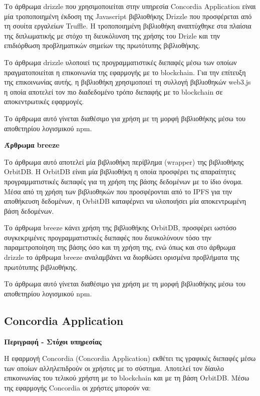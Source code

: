 Το άρθρωμα drizzle που χρησιμοποιείται στην υπηρεσία Concordia Application είναι μία τροποποιημένη έκδοση της Javascript βιβλιοθήκης Drizzle που προσφέρεται από τη σουίτα εργαλείων Truffle. Η τροποποιημένη βιβλιοθήκη αναπτύχθηκε στα πλαίσια της διπλωματικής με στόχο τη διευκόλυνση της χρήσης του Drizle και την επιδιόρθωση προβληματικών σημείων της πρωτότυπης βιβλιοθήκης.

Το άρθρωμα drizzle υλοποιεί τις προγραμματιστικές διεπαφές μέσω των οποίων πραγματοποιείται η επικοινωνία της εφαρμογής με το blockchain. Για την επίτευξη της επικοινωνίας αυτής, η βιβλιοθήκη χρησιμοποιεί τη συλλογή βιβλιοθηκών web3.js η οποία αποτελεί τον πιο διαδεδομένο τρόπο διεπαφής με το blockchain σε αποκεντρωτικές εφαρμογές.

Το άρθρωμα αυτό γίνεται διαθέσιμο για χρήση με τη μορφή βιβλιοθήκης μέσω του αποθετηρίου λογισμικού npm.

\vspace{0.5cm}
\textbf{Άρθρωμα breeze}

Το άρθρωμα αυτό αποτελεί μία βιβλιοθήκη περίβλημα (wrapper) της βιβλιοθήκης OrbitDB. Η OrbitDB είναι μία βιβλιοθήκη η οποία προσφέρει τις απαραίτητες προγραμματιστικές διεπαφές για τη χρήση της βάσης δεδομένων με το ίδιο όνομα. Μέσα από τη χρήση των βιβλιοθηκών που προσφέρονται από το IPFS για την αποθήκευση δεδομένων, η OrbitDB καταφέρνει να υλοποιήσει μία αποκεντρωμένη βάση δεδομένων.

Το άρθρωμα breeze κάνει χρήση της βιβλιοθήκης OrbitDB, προσφέρει ωστόσο συγκεκριμένες προγραμματιστικές διεπαφές που διευκολύνουν τόσο την παραμετροποίηση της βάσης όσο και τη χρήση της, ενώ όπως και στο άρθρωμα drizzle το άρθρωμα breeze αναλαμβάνει να διορθώσει ορισμένα προβλήματα της πρωτότυπης βιβλιοθήκης.

Το άρθρωμα αυτό γίνεται διαθέσιμο για χρήση με τη μορφή βιβλιοθήκης μέσω του αποθετηρίου λογισμικού npm.

\subsection{Concordia Application} \label{subsection:4-4-concordia-application-service}

\vspace{0.5cm}
\textbf{Περιγραφή - Στόχοι υπηρεσίας}

Η εφαρμογή Concordia (Concordia Application) εκθέτει τις γραφικές διεπαφές μέσω των οποίων αλληλεπιδρούν οι χρήστες με το σύστημα. Αποτελεί τον δίαυλο επικοινωνίας του τελικού χρήστη με το blockchain και με τη βάση OrbitDB. Μέσω της εφαρμογής Concordia οι χρήστες μπορούν να:


